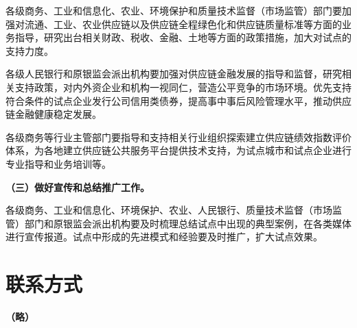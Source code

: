 各级商务、工业和信息化、农业、环境保护和质量技术监督（市场监管）部门要加强对流通、工业、农业供应链以及供应链全程绿色化和供应链质量标准等方面的业务指导，研究出台相关财政、税收、金融、土地等方面的政策措施，加大对试点的支持力度。

各级人民银行和原银监会派出机构要加强对供应链金融发展的指导和监督，研究相关支持政策，对内外资企业和机构一视同仁，营造公平竞争的市场环境。优先支持符合条件的试点企业发行公司信用类债券，提高事中事后风险管理水平，推动供应链金融健康稳定发展。

各级商务等行业主管部门要指导和支持相关行业组织探索建立供应链绩效指数评价体系，为各地建立供应链公共服务平台提供技术支持，为试点城市和试点企业进行专业指导和业务培训等。

{ \bf （三）做好宣传和总结推广工作。 }

各级商务、工业和信息化、环境保护、农业、人民银行、质量技术监督（市场监管）部门和原银监会派出机构要及时梳理总结试点中出现的典型案例，在各类媒体进行宣传报道。试点中形成的先进模式和经验要及时推广，扩大试点效果。

\section{联系方式}
{ \bf （略） }
